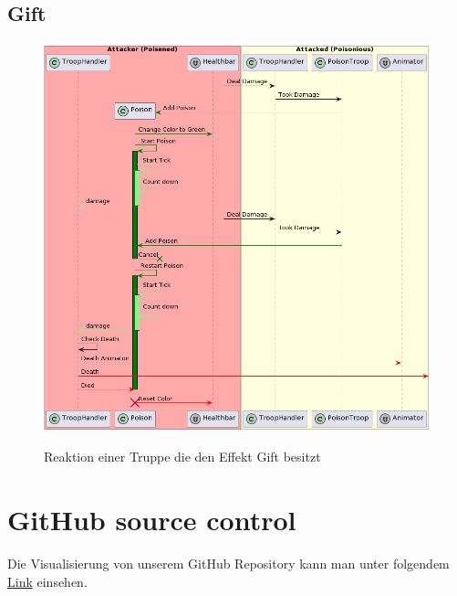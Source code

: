 \subsection{Gift}
\begin{figure}[H]
    \centering
    \includegraphics[width=15cm]{resources/Poison.png} \\
    \caption{Reaktion einer Truppe die den Effekt Gift besitzt}
\end{figure}


\section{GitHub source control}
Die Visualisierung von unserem GitHub Repository kann man unter folgendem \href{https://www.youtube.com/watch?v=IQT37uwpcg4}{Link} einsehen.